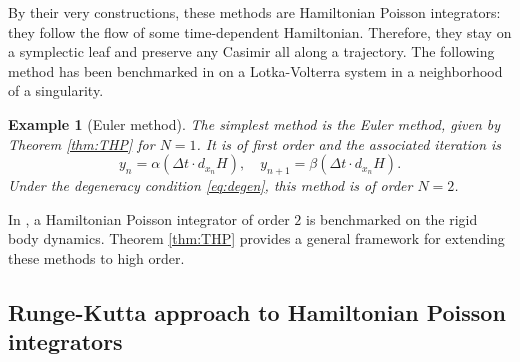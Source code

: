 \documentclass[a4paper,11pt]{article}
\newtheorem{ex}[theorem]{Example}
\begin{document}
By their very constructions, these methods are Hamiltonian Poisson integrators: they follow the flow of some time-dependent Hamiltonian. Therefore, they stay on a symplectic leaf and preserve any Casimir all along a trajectory. The following method has been benchmarked in \cite[Sec. 5.2.]{Oscar2022} on a Lotka-Volterra system in a neighborhood of a singularity.

\begin{ex}[Euler method]
The simplest method is the Euler method, given by Theorem \ref{thm:THP} for $N=1$. It is of first order and the associated iteration is
\[
y_n = \alpha(\Delta t \cdot d_{x_n} H),\quad
y_{n+1} = \beta(\Delta t \cdot  d_{x_n} H).
\]
Under the degeneracy condition \eqref{eq:degen}, this method is of order $N=2$.
\end{ex}

In \cite{Oscar2022}, a Hamiltonian Poisson integrator of order $2$ is benchmarked on the rigid body dynamics. Theorem \ref{thm:THP} provides a general framework for extending these methods to high order.













\subsection{Runge-Kutta approach to Hamiltonian Poisson integrators}
\end{document}

